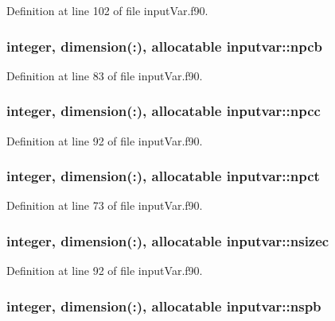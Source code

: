 Definition at line 102 of file input\-Var.\-f90.

\hypertarget{classinputvar_a4f83c89634ccb8f94fca08a023648791}{
\subsubsection[{npcb}]{\setlength{\rightskip}{0pt plus 5cm}integer, dimension(\-:), allocatable inputvar\-::npcb}}\label{classinputvar_a4f83c89634ccb8f94fca08a023648791}


Definition at line 83 of file input\-Var.\-f90.

\hypertarget{classinputvar_a78f4d80d45d564c96dd9101258656f66}{
\subsubsection[{npcc}]{\setlength{\rightskip}{0pt plus 5cm}integer, dimension(\-:), allocatable inputvar\-::npcc}}\label{classinputvar_a78f4d80d45d564c96dd9101258656f66}


Definition at line 92 of file input\-Var.\-f90.

\hypertarget{classinputvar_a0f5eeaa6713564c7a3aa547b8ce8bae9}{
\subsubsection[{npct}]{\setlength{\rightskip}{0pt plus 5cm}integer, dimension(\-:), allocatable inputvar\-::npct}}\label{classinputvar_a0f5eeaa6713564c7a3aa547b8ce8bae9}


Definition at line 73 of file input\-Var.\-f90.

\hypertarget{classinputvar_af28da5ec88564638bee476f2a37f5308}{
\subsubsection[{nsizec}]{\setlength{\rightskip}{0pt plus 5cm}integer, dimension(\-:), allocatable inputvar\-::nsizec}}\label{classinputvar_af28da5ec88564638bee476f2a37f5308}


Definition at line 92 of file input\-Var.\-f90.

\hypertarget{classinputvar_aa1e78ecd4b3cbb3f08b770cf604a5d3d}{
\subsubsection[{nspb}]{\setlength{\rightskip}{0pt plus 5cm}integer, dimension(\-:), allocatable inputvar\-::nspb}}\label{classinputvar_aa1e78ecd4b3cbb3f08b770cf604a5d3d}


